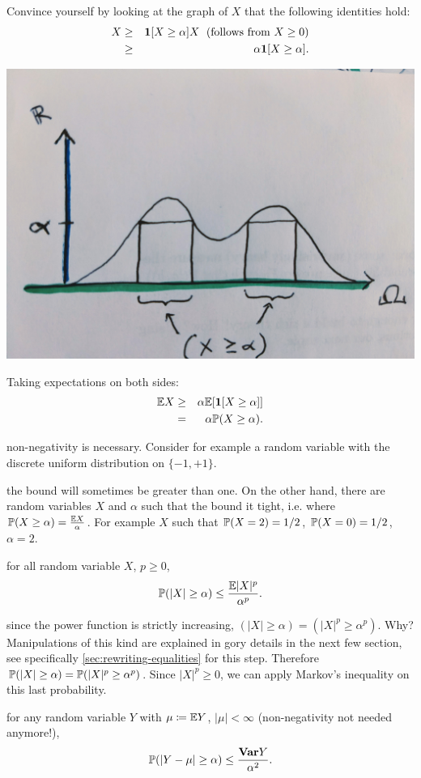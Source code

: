 \documentclass{article}
\begin{document}
 Convince yourself by looking at the graph of $X$ that the following identities hold: 
\begin{eqnarray*} 
X &\ge& \1[X \ge \alpha] X\;\text{ (follows from }X \ge 0\text{)} \\
&\ge& \alpha \1[X \ge \alpha].
\end{eqnarray*}
\begin{center}
	\includegraphics[width=0.5\linewidth]{figures/markov}
\end{center}
Taking expectations on both sides:
\begin{eqnarray*}
\E X &\ge& \alpha \E[\1[X \ge \alpha]] \\
&=& \alpha \P(X \ge \alpha).
\end{eqnarray*}

 non-negativity is necessary. Consider for example a random variable with the discrete uniform distribution on $\{-1, +1\}$. 

 the bound will sometimes be greater than one. On the other hand, there are random variables $X$ and $\alpha$ such that the bound it tight, i.e. where $\P( X \ge \alpha) = \frac{\E X}{\alpha}$. For example $X$ such that $\P(X = 2) = 1/2$, $\P(X = 0) = 1/2$, $\alpha = 2$.

 for all random variable $X$, $p \ge 0$,
\[ \P(|X| \ge \alpha) \le \frac{\E |X|^p}{\alpha^p}. \]

 since the power function is strictly increasing, $(|X| \ge \alpha) = (|X|^p \ge \alpha^p)$. Why? Manipulations of this kind are explained in gory details in the next few section, see specifically \ref{sec:rewriting-equalities} for this step. Therefore $\P(|X| \ge \alpha) = \P(|X|^p \ge \alpha^p)$. Since $|X|^p \ge 0$, we can apply Markov's inequality on this last probability.


 for any random variable $Y$ with $\mu \defeq \E Y$, $|\mu| < \infty$ (non-negativity not needed anymore!),
\[ \P(|Y - \mu| \ge \alpha) \le \frac{\var Y}{\alpha^2}. \]
\end{document}
